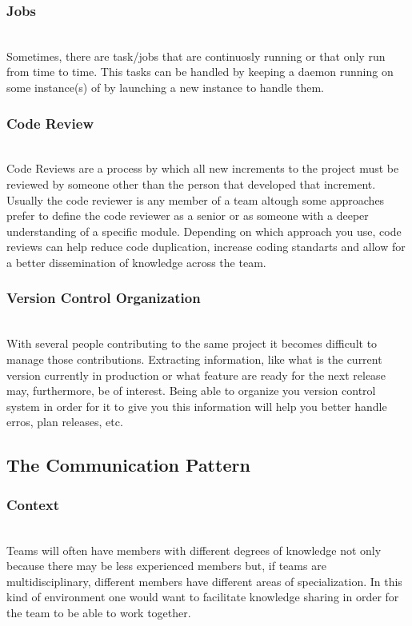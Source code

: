 \documentclass{llncs}
\begin{document}
    \subsubsection{Jobs}~\\
    Sometimes, there are task/jobs that are continuosly running or that only run from time to time. This tasks can be handled by keeping a daemon running on some instance(s) of by launching a new instance to handle them.

    \subsubsection{Code Review}~\\
    Code Reviews are a process by which all new increments to the project must be reviewed by someone other than the person that developed that increment. Usually the code reviewer is any member of a team altough some approaches prefer to define the code reviewer as a senior or as someone with a deeper understanding of a specific module.
    Depending on which approach you use, code reviews can help reduce code duplication, increase coding standarts and allow for a better dissemination of knowledge across the team.

    \subsubsection{Version Control Organization}~\\
    With several people contributing to the same project it becomes difficult to manage those contributions. Extracting information, like what is the current version currently in production or what feature are ready for the next release may, furthermore, be of interest. Being able to organize you version control system in order for it to give you this information will help you better handle erros, plan releases, etc.

	\subsection{The Communication Pattern}
		\subsubsection{Context}~\\

		Teams will often have members with different degrees of knowledge not only because there may be less experienced members but, if teams are multidisciplinary, different members have different areas of specialization.
		In this kind of environment one would want to facilitate knowledge sharing in order for the team to be able to work together.
\end{document}
